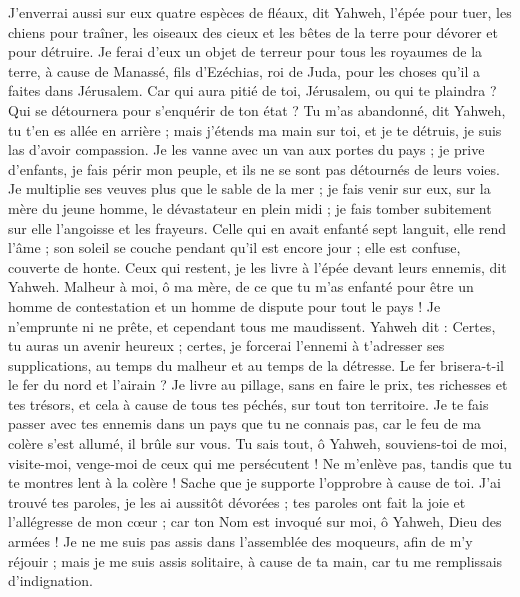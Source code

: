 \begin{multicols}{2}
J'enverrai aussi sur eux quatre espèces de fléaux, dit Yahweh, l'épée pour tuer, les chiens pour traîner, les oiseaux des cieux et les bêtes de la terre pour dévorer et pour détruire.
Je ferai d'eux un objet de terreur pour tous les royaumes de la terre, à cause de Manassé, fils d'Ezéchias, roi de Juda, pour les choses qu'il a faites dans Jérusalem.
Car qui aura pitié de toi, Jérusalem, ou qui te plaindra ? Qui se détournera pour s'enquérir de ton état ?
Tu m'as abandonné, dit Yahweh, tu t'en es allée en arrière ; mais j'étends ma main sur toi, et je te détruis, je suis las d'avoir compassion.
Je les vanne avec un van aux portes du pays ; je prive d'enfants, je fais périr mon peuple, et ils ne se sont pas détournés de leurs voies.
Je multiplie ses veuves plus que le sable de la mer ; je fais venir sur eux, sur la mère du jeune homme, le dévastateur en plein midi ; je fais tomber subitement sur elle l'angoisse et les frayeurs.
Celle qui en avait enfanté sept languit, elle rend l'âme ; son soleil se couche pendant qu'il est encore jour ; elle est confuse, couverte de honte. Ceux qui restent, je les livre à l'épée devant leurs ennemis, dit Yahweh.
Malheur à moi, ô ma mère, de ce que tu m'as enfanté pour être un homme de contestation et un homme de dispute pour tout le pays ! Je n'emprunte ni ne prête, et cependant tous me maudissent.
Yahweh dit : Certes, tu auras un avenir heureux ; certes, je forcerai l'ennemi à t'adresser ses supplications, au temps du malheur et au temps de la détresse.
Le fer brisera-t-il le fer du nord et l'airain ?
Je livre au pillage, sans en faire le prix, tes richesses et tes trésors, et cela à cause de tous tes péchés, sur tout ton territoire.
Je te fais passer avec tes ennemis dans un pays que tu ne connais pas, car le feu de ma colère s'est allumé, il brûle sur vous.
Tu sais tout, ô Yahweh, souviens-toi de moi, visite-moi, venge-moi de ceux qui me persécutent ! Ne m'enlève pas, tandis que tu te montres lent à la colère ! Sache que je supporte l'opprobre à cause de toi.
J'ai trouvé tes paroles, je les ai aussitôt dévorées ; tes paroles ont fait la joie et l'allégresse de mon cœur ; car ton Nom est invoqué sur moi, ô Yahweh, Dieu des armées !
Je ne me suis pas assis dans l'assemblée des moqueurs, afin de m'y réjouir ; mais je me suis assis solitaire, à cause de ta main, car tu me remplissais d'indignation.

\end{multicols}
